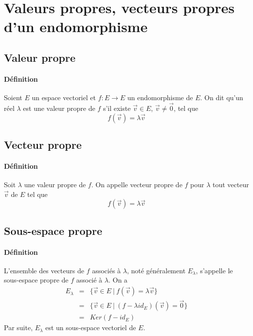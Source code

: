 %
%
\section{Valeurs propres, vecteurs propres d'un endomorphisme}
%
%
%
\subsection{Valeur propre}
%
\paragraph{Définition} Soient $E$ un espace vectoriel et $f: E \rightarrow E$ un endomorphisme de $E$. On dit qu'un réel $\lambda$ est une valeur propre de $f$ s'il existe $\vec{v} \in E$, $\vec{v} \neq \vec{0}$, tel que 
$$f(\vec{v}) = \lambda\vec{v}$$

%
\subsection{Vecteur propre}
%
\paragraph{Définition} Soit $\lambda$ une valeur propre de $f$. On appelle vecteur propre de $f$ pour $\lambda$ tout vecteur $\vec{v}$ de $E$ tel que 
$$f(\vec{v}) = \lambda \vec{v}$$

%
\subsection{Sous-espace propre}
%
\paragraph{Définition} L'ensemble des vecteurs de $f$ associés à $\lambda$, noté généralement $E_\lambda$, s'appelle le sous-espace propre de $f$ associé à $\lambda$. On a
\begin{eqnarray*}
  E_{\lambda} &=& \{\vec{v} \in E ~ \vert ~ f(\vec{v}) = \lambda\vec{v} \} \\
    &=& \{\vec{v} \in E ~ \vert ~ (f-\lambda id_E)(\vec{v}) = \vec{0} \} \\
    &=& Ker(f-id_E)
\end{eqnarray*}
Par suite, $E_\lambda$ est un sous-espace vectoriel de $E$.

